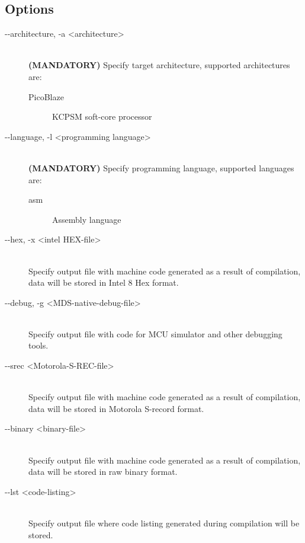     \subsection{Options}
        \begin{description}
            \item[-{}-architecture, -a <architecture>]~\\
                \textbf{(MANDATORY)} Specify target architecture, supported architectures are:
                \begin{description}
                    \item[PicoBlaze] KCPSM soft-core processor
                \end{description}

            \item[-{}-language, -l <programming language>]~\\
                \textbf{(MANDATORY)} Specify programming language, supported languages are:
                \begin{description}
                    \item[asm] Assembly language
                \end{description}

            \item[-{}-hex, -x <intel HEX-file>]~\\
                Specify output file with machine code generated as a result of compilation, data will be stored in Intel 8 Hex format.

            \item[-{}-debug, -g <MDS-native-debug-file>]~\\
                Specify output file with code for MCU simulator and other debugging tools.

            \item[-{}-srec <Motorola-S-REC-file>]~\\
                Specify output file with machine code generated as a result of compilation, data will be stored in Motorola S-record format.

            \item[-{}-binary <binary-file>]~\\
                Specify output file with machine code generated as a result of compilation, data will be stored in raw binary format.

            \item[-{}-lst <code-listing>]~\\
                Specify output file where code listing generated during compilation will be stored.


\end{description}
